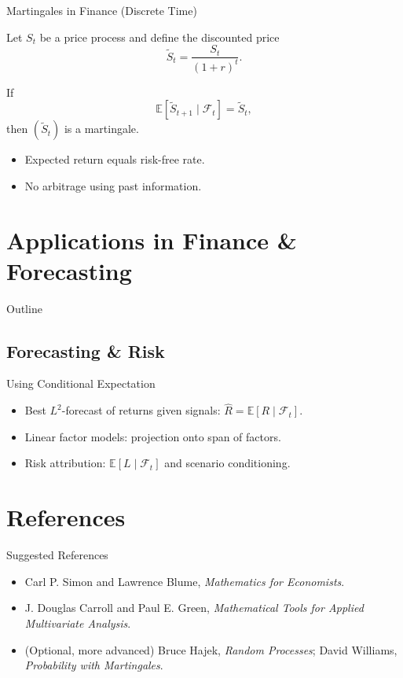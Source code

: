 \documentclass[aspectratio=169]{beamer}
\begin{document}
\begin{frame}{Martingales in Finance (Discrete Time)}

Let \(S_t\) be a price process and define the discounted price
\[
\tilde S_t = \frac{S_t}{(1+r)^t}.
\]\pause

\medskip

If
\[
\mathbb{E}[\tilde S_{t+1}\mid\mathcal{F}_t]=\tilde S_t,
\]
then \((\tilde S_t)\) is a martingale.\pause

\medskip

\begin{itemize}
  \item Expected return equals risk-free rate.\pause
  \item No arbitrage using past information.
\end{itemize}

\end{frame}
\section{Applications in Finance \& Forecasting}

\begin{frame}{Outline}
\end{frame}

\subsection{Forecasting \& Risk}
\begin{frame}{Using Conditional Expectation}
\begin{itemize}
  \item Best \(L^2\)-forecast of returns given signals: \(\hat R=\mathbb{E}[R\mid \mathcal{F}_t]\).
  \item Linear factor models: projection onto span of factors.
  \item Risk attribution: \(\mathbb{E}[L\mid \mathcal{F}_t]\) and scenario conditioning.
\end{itemize}
\end{frame}


\section{References}
\begin{frame}{Suggested References}
\begin{itemize}
  \item Carl P. Simon and Lawrence Blume, \textit{Mathematics for Economists}.
  \item J. Douglas Carroll and Paul E. Green, \textit{Mathematical Tools for Applied Multivariate Analysis}.
  \item (Optional, more advanced) Bruce Hajek, \textit{Random Processes}; David Williams, \textit{Probability with Martingales}.
\end{itemize}
\end{frame}
\end{document}
